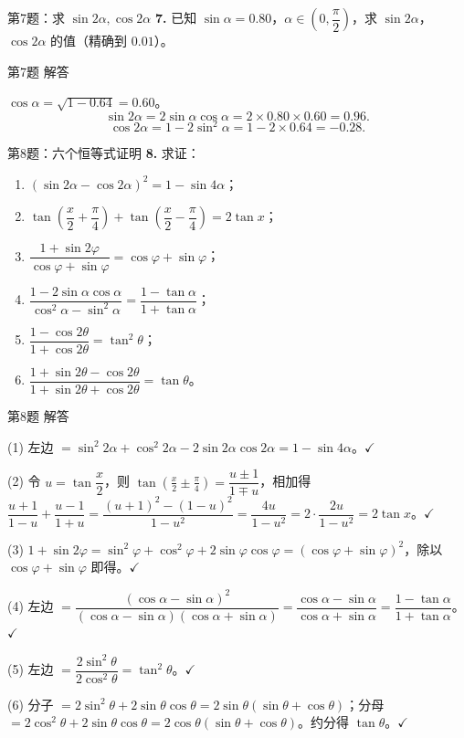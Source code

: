 \documentclass[10pt,aspectratio=169,serif]{beamer}
\begin{document}
\begin{frame}[t]{第7题：求 $\sin 2\alpha,\cos 2\alpha$}
\textbf{7.} 已知 $\sin\alpha=0.80$，$\alpha\in\left(0,\dfrac{\pi}{2}\right)$，求 $\sin 2\alpha$，$\cos 2\alpha$ 的值（精确到 $0.01$）。
\end{frame}

\begin{frame}[t]{第7题 解答}
\begin{tcolorbox}[colback=orange!10,colframe=orange,title=\textbf{解}]
$\cos\alpha=\sqrt{1-0.64}=0.60$。
\[
\sin 2\alpha=2\sin\alpha\cos\alpha=2\times0.80\times0.60=0.96.
\]
\[
\cos 2\alpha=1-2\sin^2\alpha=1-2\times0.64=-0.28.
\]
\end{tcolorbox}
\end{frame}

\begin{frame}[t]{第8题：六个恒等式证明}
\textbf{8.} 求证：
\begin{enumerate}
  \item $(\sin 2\alpha-\cos 2\alpha)^2=1-\sin 4\alpha$；
  \item $\tan\!\left(\dfrac{x}{2}+\dfrac{\pi}{4}\right)+\tan\!\left(\dfrac{x}{2}-\dfrac{\pi}{4}\right)=2\tan x$；
  \item $\dfrac{1+\sin 2\varphi}{\cos\varphi+\sin\varphi}=\cos\varphi+\sin\varphi$；
  \item $\dfrac{1-2\sin\alpha\cos\alpha}{\cos^2\alpha-\sin^2\alpha}=\dfrac{1-\tan\alpha}{1+\tan\alpha}$；
  \item $\dfrac{1-\cos 2\theta}{1+\cos 2\theta}=\tan^2\theta$；
  \item $\dfrac{1+\sin 2\theta-\cos 2\theta}{1+\sin 2\theta+\cos 2\theta}=\tan\theta$。
\end{enumerate}
\end{frame}

\begin{frame}[t]{第8题 解答}
\begin{tcolorbox}[colback=orange!10,colframe=orange,title=\textbf{证明}]
(1) 左边 $=\sin^2 2\alpha+\cos^2 2\alpha-2\sin 2\alpha\cos 2\alpha=1-\sin 4\alpha$。$\checkmark$

(2) 令 $u=\tan\dfrac{x}{2}$，则 $\tan(\frac{x}{2}\pm\frac{\pi}{4})=\dfrac{u\pm1}{1\mp u}$，相加得 $\dfrac{u+1}{1-u}+\dfrac{u-1}{1+u}=\dfrac{(u+1)^2-(1-u)^2}{1-u^2}=\dfrac{4u}{1-u^2}=2\cdot\dfrac{2u}{1-u^2}=2\tan x$。$\checkmark$

(3) $1+\sin 2\varphi=\sin^2\varphi+\cos^2\varphi+2\sin\varphi\cos\varphi=(\cos\varphi+\sin\varphi)^2$，除以 $\cos\varphi+\sin\varphi$ 即得。$\checkmark$

(4) 左边 $=\dfrac{(\cos\alpha-\sin\alpha)^2}{(\cos\alpha-\sin\alpha)(\cos\alpha+\sin\alpha)}=\dfrac{\cos\alpha-\sin\alpha}{\cos\alpha+\sin\alpha}=\dfrac{1-\tan\alpha}{1+\tan\alpha}$。$\checkmark$

(5) 左边 $=\dfrac{2\sin^2\theta}{2\cos^2\theta}=\tan^2\theta$。$\checkmark$

(6) 分子 $=2\sin^2\theta+2\sin\theta\cos\theta=2\sin\theta(\sin\theta+\cos\theta)$；分母 $=2\cos^2\theta+2\sin\theta\cos\theta=2\cos\theta(\sin\theta+\cos\theta)$。约分得 $\tan\theta$。$\checkmark$
\end{tcolorbox}
\end{frame}
\end{document}
